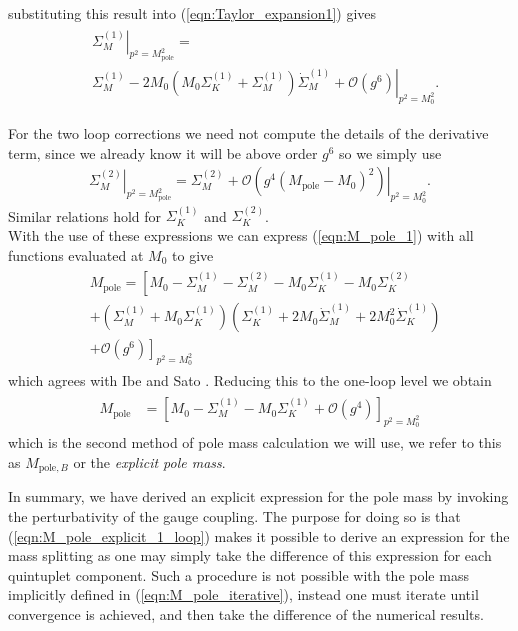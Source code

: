 \documentclass[11pt]{article}
\def\Mp{M_{\text{pole}}}
\def\Mpb{M_{\text{pole},B}}
\begin{document}
substituting this result into (\ref{eqn:Taylor_expansion1}) gives
\begin{align}
\begin{split}
&\left.\Sigma^{(1)}_M\right|_{p^2=\Mp^2}=\\ &\left.\Sigma^{(1)}_M-2M_0(M_0\Sigma^{(1)}_K+\Sigma^{(1)}_M)\dot{\Sigma}^{(1)}_M+\mathcal{O}\left(g^6\right)\right|_{p^2=M_0^2}.
\end{split}
\end{align}


For the two loop corrections we need not compute the details of the derivative term, since we already know it will be above order $g^6$ so we simply use
\begin{align*}
\left.\Sigma^{(2)}_M\right|_{p^2=\Mp^2}=\left.\Sigma^{(2)}_M+\mathcal{O}\left(g^4(\Mp-M_0)^2\right)\right|_{p^2=M_0^2}.
\end{align*}
Similar relations hold for $\Sigma^{(1)}_K$ and $\Sigma^{(2)}_K$.\\

With the use of these expressions we can express (\ref{eqn:M_pole_1}) with all functions evaluated at $M_0$ to give
\begin{align}
\begin{split}
&\Mp=\left[M_0-\Sigma^{(1)}_M-\Sigma^{(2)}_M-M_0\Sigma^{(1)}_K-M_0\Sigma^{(2)}_K\right.\\
&+(\Sigma^{(1)}_M+M_0\Sigma^{(1)}_K)(\Sigma^{(1)}_K+2M_0\dot{\Sigma}^{(1)}_M+2M_0^2\dot{\Sigma}^{(1)}_K)\\
&\left.+\mathcal{O}\left(g^6\right)\right]_{p^2=M_0^2} \label{eqn:M_pole_explicit}
\end{split}
\end{align}
which agrees with Ibe and Sato \cite{Ibe2013a}.  Reducing this to the one-loop level we obtain
\begin{align}
\begin{split}
\Mp&=\left[M_0-\Sigma^{(1)}_M-M_0\Sigma^{(1)}_K+\mathcal{O}\left(g^4\right)\right]_{p^2=M_0^2} \label{eqn:M_pole_explicit_1_loop}
\end{split}
\end{align}
which is the second method of pole mass calculation we will use, we refer to this as $\Mpb$ or the \textit{explicit pole mass}.

In summary, we have derived an explicit expression for the pole mass by invoking the perturbativity of the gauge coupling.  The purpose for doing so is that (\ref{eqn:M_pole_explicit_1_loop}) makes it possible to derive an expression for the mass splitting as one may simply take the difference of this expression for each quintuplet component.  Such a procedure is not possible with the pole mass implicitly defined in (\ref{eqn:M_pole_iterative}), instead one must iterate until convergence is achieved, and then take the difference of the numerical results.
\end{document}
